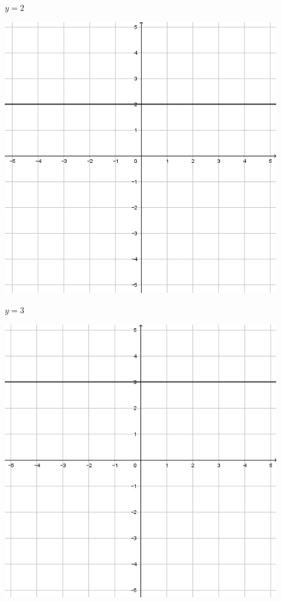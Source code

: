 \documentclass[a4paper]{oblivoir}
\begin{document}
\begin{minipage}{0.45\textwidth}\centering
\(y=2\)
\par\bigskip\includegraphics[width=0.9\textwidth]{img/1_line_25}
\end{minipage}
\begin{minipage}{0.45\textwidth}\centering
\(y=3\)
\par\bigskip\includegraphics[width=0.9\textwidth]{img/1_line_26}
\end{minipage}\bigskip\bigskip\par
\end{document}
